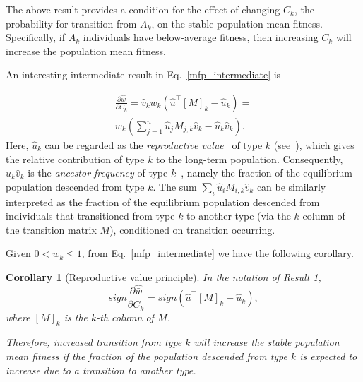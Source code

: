 \documentclass[9pt, a4paper, twocolumn]{extarticle}
\newcommand*{\tr}{^\intercal}
\newtheorem{corollary}{Corollary}
\begin{document}
The above result provides a condition for the effect of changing $C_k$, the probability for transition from $A_k$, on the stable population mean fitness.
Specifically, if $A_k$ individuals have below-average fitness, then increasing $C_k$ will increase the population mean fitness.


An interesting intermediate result in Eq.~\ref{mfp_intermediate} is

\begin{equation}
\begin{aligned}
\frac{\partial \hat{\bar w}}{\partial C_k} = 
\hat v_k w_k (\hat u\tr[M]_k - \hat u_k) = \\
w_k (\sum_{j=1}^{n}{\hat u_j M_{j,k} \hat v_k} - \hat u_k \hat v_k).
\end{aligned}
\end{equation}
Here, $\hat u_k$ can be regarded as the \emph{reproductive value}~\citep[pg.~27]{Fisher1930} of type $k$ (see~), which gives the relative contribution of type $k$ to the long-term population.
Consequently, $\hat u_k \hat v_k$ is the \emph{ancestor frequency} of type $k$~\citep{Hermisson2002}, namely the fraction of the equilibrium population descended from type $k$.
The sum $\sum_i{\hat u_i M_{i,k} \hat v_k}$ can be similarly interpreted as the fraction of the equilibrium population descended from individuals that transitioned from type $k$ to another type (via the $k$ column of the transition matrix $M$), conditioned on transition occurring.

Given $0 < w_k\le 1$, from Eq.~\ref{mfp_intermediate} we have the following corollary.

\begin{corollary}[Reproductive value principle]
In the notation of Result 1,
\begin{equation}
sign \frac{\partial \hat{\bar w}}{\partial C_k} = 
sign (\hat u\tr [M]_k - \hat u_k),
\end{equation}
where $[M]_k$ is the $k$-th column of $M$.

Therefore, increased transition from type $k$ will increase the stable population mean fitness if the fraction of the population descended from type $k$ is expected to increase due to a transition to another type. 
\end{corollary}

\end{document}
